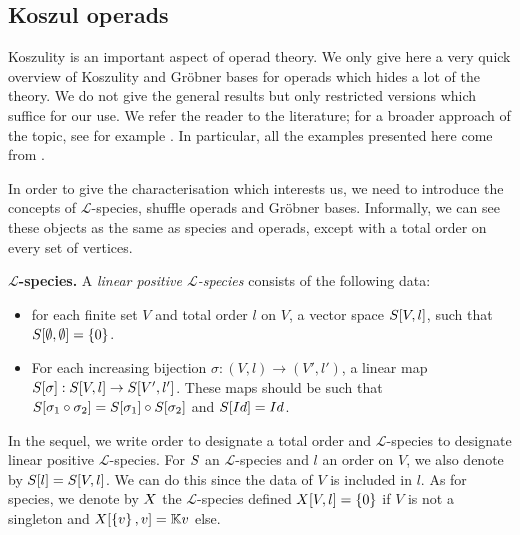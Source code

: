 \documentclass[11pt]{article}
\theoremstyle{definition}
\numberwithin{equation}{section}
\newcommand{\set}[1]{\left\{#1\right\}}
\newcommand{\spe}[1]{\normalfont{\textsc{#1}}}
\newcommand{\K}{\mathbb{K}}
\newcommand{\id}{Id}
\begin{document}
\subsection*{Koszul operads}\label{sec_koszul}
Koszulity is an important aspect of operad theory. We only give here a very quick overview of Koszulity and Gröbner bases for operads which hides a 
lot of the theory. We do not give the general results but only restricted versions which suffice for our use.
We refer the reader to the literature; for a broader approach of the topic, see for example \cite{LV12, Men15, Hof10, DK10}.
In particular, all the examples presented here come from \cite{DK10}.

In order to give the characterisation which interests us, we need to introduce the concepts of $\mathscr{L}$-species, shuffle operads and Gröbner bases. 
Informally, we can see these objects as the same as species and operads, except with a total order on every set of vertices.


\noindent\textbf{$\mathscr{L}$-species.} A {\em linear positive $\mathscr{L}$-species}  consists of the following data:
\begin{itemize}
   \item for each finite set $V$ and total order $l$ on $V$, a 
   vector space $\spe{S}[V,l]$, such that $\spe{S}[\emptyset,\emptyset]=\set{0}$.
   \item For each increasing bijection $\sigma: (V,l)\to (V',l')$, a linear map $\spe{S}[\sigma]:\spe{S}[V,l]\to \spe{S}[V',l']$.
   These maps should be such that $\spe{S}[\sigma_1\circ\sigma_2] = \spe{S}[\sigma_1]\circ \spe{S}[\sigma_2]$ and $\spe{S}[\id] = \id$.
\end{itemize}


In the sequel, we write order to designate a total order and $\mathscr{L}$-species to designate linear positive $\mathscr{L}$-species. For $\spe{S}$ an
$\mathscr{L}$-species and $l$ an order on $V$, we also denote by $\spe{S}[l]=\spe{S}[V,l]$. We can do this since the data of $V$ is included in $l$.
As for species, we denote by $\spe{X}$ the $\mathscr{L}$-species defined $\spe{X}[V,l]=\set{0}$ if $V$ is not a singleton and $\spe{X}[\set{v},v]= \K{v}$ else.
\end{document}
